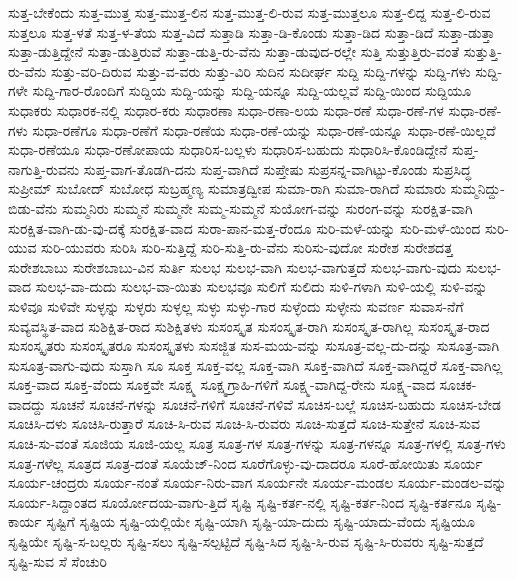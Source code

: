 {ಸುತ್ತ-ಬೇಕೆಂದು
ಸುತ್ತ-ಮುತ್ತ
ಸುತ್ತ-ಮುತ್ತ-ಲಿನ
ಸುತ್ತ-ಮುತ್ತ-ಲಿ-ರುವ
ಸುತ್ತ-ಮುತ್ತಲೂ
ಸುತ್ತ-ಲಿದ್ದ
ಸುತ್ತ-ಲಿ-ರುವ
ಸುತ್ತಲೂ
ಸುತ್ತ-ಳತೆ
ಸುತ್ತ-ಳ-ತೆಯ
ಸುತ್ತ-ವಿದೆ
ಸುತ್ತಾಡಿ
ಸುತ್ತಾ-ಡಿ-ಕೊಂಡು
ಸುತ್ತಾ-ಡಿದ
ಸುತ್ತಾ-ಡಿದೆ
ಸುತ್ತಾ-ಡುತ್ತಾ
ಸುತ್ತಾ-ಡುತ್ತಿದ್ದೇನೆ
ಸುತ್ತಾ-ಡುತ್ತಿರುವೆ
ಸುತ್ತಾ-ಡುತ್ತಿ-ರು-ವೆನು
ಸುತ್ತಾ-ಡುವುದ-ರಲ್ಲೇ
ಸುತ್ತಿ
ಸುತ್ತುತ್ತಿರು-ವಂತೆ
ಸುತ್ತುತ್ತಿ-ರು-ವೆನು
ಸುತ್ತು-ವರಿ-ದಿರುವ
ಸುತ್ತು-ವ-ವರು
ಸುತ್ತು-ವಿರಿ
ಸುದಿನ
ಸುದೀರ್ಘ
ಸುದ್ದಿ
ಸುದ್ದಿ-ಗಳನ್ನು
ಸುದ್ದಿ-ಗಳು
ಸುದ್ದಿ-ಗಳೇ
ಸುದ್ದಿ-ಗಾರ-ರೊಂದಿಗೆ
ಸುದ್ದಿಯ
ಸುದ್ದಿ-ಯನ್ನು
ಸುದ್ದಿ-ಯನ್ನೂ
ಸುದ್ದಿ-ಯಲ್ಲವೆ
ಸುದ್ದಿ-ಯಿಂದ
ಸುದ್ದಿಯೂ
ಸುಧಾಕರು
ಸುಧಾರಕ-ನಲ್ಲಿ
ಸುಧಾರ-ಕರು
ಸುಧಾರಣಾ
ಸುಧಾ-ರಣಾ-ಲಯ
ಸುಧಾ-ರಣೆ
ಸುಧಾ-ರಣೆ-ಗಳ
ಸುಧಾ-ರಣೆ-ಗಳು
ಸುಧಾ-ರಣೆಗೂ
ಸುಧಾ-ರಣೆಗೆ
ಸುಧಾ-ರಣೆಯ
ಸುಧಾ-ರಣೆ-ಯನ್ನು
ಸುಧಾ-ರಣೆ-ಯನ್ನೂ
ಸುಧಾ-ರಣೆ-ಯಿಲ್ಲದೆ
ಸುಧಾ-ರಣೆಯೂ
ಸುಧಾ-ರಣೋಪಾಯ
ಸುಧಾರಿಸ-ಬಲ್ಲಳು
ಸುಧಾರಿಸ-ಬಹುದು
ಸುಧಾರಿಸಿ-ಕೊಂಡಿದ್ದೇನೆ
ಸುಪ್ತ-ನಾಗುತ್ತಿ-ರುವನು
ಸುಪ್ತ-ವಾಗ-ತೊಡಗಿ-ದನು
ಸುಪ್ತ-ವಾಗಿದೆ
ಸುಪ್ತೇಷು
ಸುಪ್ರಸನ್ನ-ವಾಗಿಟ್ಟು-ಕೊಂಡು
ಸುಪ್ರಸಿದ್ಧ
ಸುಪ್ರೀಮ್
ಸುಬೋದ್
ಸುಬೋಧ
ಸುಬ್ರಹ್ಮಣ್ಯ
ಸುಮಾತ್ರದ್ವೀಪ
ಸುಮಾ-ರಾಗಿ
ಸುಮಾ-ರಾಗಿದೆ
ಸುಮಾರು
ಸುಮ್ಮನಿದ್ದು-ಬಿಡು-ವೆನು
ಸುಮ್ಮನಿರು
ಸುಮ್ಮನೆ
ಸುಮ್ಮನೇ
ಸುಮ್ಮ-ಸುಮ್ಮನೆ
ಸುಯೋಗ-ವನ್ನು
ಸುರಂಗ-ವನ್ನು
ಸುರಕ್ಷಿತ-ವಾಗಿ
ಸುರಕ್ಷಿತ-ವಾಗಿ-ಡು-ವು-ದಕ್ಕೆ
ಸುರಕ್ಷಿತ-ವಾದ
ಸುರಾ-ಪಾನ-ಮತ್ತ-ರೆಂದೂ
ಸುರಿ-ಮಳೆ-ಯನ್ನು
ಸುರಿ-ಮಳೆ-ಯಿಂದ
ಸುರಿ-ಯುವ
ಸುರಿ-ಯುವರು
ಸುರಿಸಿ
ಸುರಿ-ಸುತ್ತಿದ್ದೆ
ಸುರಿ-ಸುತ್ತಿ-ರು-ವೆನು
ಸುರಿಸು-ವುದೋ
ಸುರೇಶ
ಸುರೇಶದತ್ತ
ಸುರೇಶಬಾಬು
ಸುರೇಶಬಾಬು-ವಿನ
ಸುರ್ತಿ
ಸುಲಭ
ಸುಲಭ-ವಾಗಿ
ಸುಲಭ-ವಾಗುತ್ತದೆ
ಸುಲಭ-ವಾಗು-ವುದು
ಸುಲಭ-ವಾದ
ಸುಲಭ-ವಾ-ದುದು
ಸುಲಭ-ವಾ-ಯಿತು
ಸುಲಭವೂ
ಸುಲಿಗೆ
ಸುಲಿದು
ಸುಳಿ-ಗಳಾಗಿ
ಸುಳಿ-ಯಲ್ಲಿ
ಸುಳಿ-ವನ್ನು
ಸುಳಿವೂ
ಸುಳಿವೇ
ಸುಳ್ಳನ್ನು
ಸುಳ್ಳರು
ಸುಳ್ಳಲ್ಲ
ಸುಳ್ಳು
ಸುಳ್ಳು-ಗಾರ
ಸುಳ್ಳೆಂದು
ಸುಳ್ಳೇನು
ಸುವರ್ಣ
ಸುವಾಸ-ನೆಗೆ
ಸುವ್ಯವಸ್ಥಿತ-ವಾದ
ಸುಶಿಕ್ಷಿತ-ರಾದ
ಸುಶಿಕ್ಷಿತಳು
ಸುಸಂಸ್ಕೃತ
ಸುಸಂಸ್ಕೃತ-ರಾಗಿ
ಸುಸಂಸ್ಕೃತ-ರಾಗಿಲ್ಲ
ಸುಸಂಸ್ಕೃತ-ರಾದ
ಸುಸಂಸ್ಕೃತರು
ಸುಸಂಸ್ಕೃತರೂ
ಸುಸಂಸ್ಕೃತಳು
ಸುಸಜ್ಜಿತ
ಸುಸ-ಮಯ-ವನ್ನು
ಸುಸೂತ್ರ-ವಲ್ಲ-ದು-ದನ್ನು
ಸುಸೂತ್ರ-ವಾಗಿ
ಸುಸೂತ್ರ-ವಾಗು-ವುದು
ಸುಸ್ತಾಗಿ
ಸೂ
ಸೂಕ್ತ
ಸೂಕ್ತ-ವಲ್ಲ
ಸೂಕ್ತ-ವಾಗಿ
ಸೂಕ್ತ-ವಾಗಿದೆ
ಸೂಕ್ತ-ವಾಗಿದ್ದರೆ
ಸೂಕ್ತ-ವಾಗಿಲ್ಲ
ಸೂಕ್ತ-ವಾದ
ಸೂಕ್ತ-ವೆಂದು
ಸೂಕ್ತವೇ
ಸೂಕ್ಷ್ಮ
ಸೂಕ್ಷ್ಮಗ್ರಾಹಿ-ಗಳಿಗೆ
ಸೂಕ್ಷ್ಮ-ವಾಗಿದ್ದ-ರೇನು
ಸೂಕ್ಷ್ಮ-ವಾದ
ಸೂಚಕ-ವಾದದ್ದು
ಸೂಚನೆ
ಸೂಚನೆ-ಗಳನ್ನು
ಸೂಚನೆ-ಗಳಿಗೆ
ಸೂಚನೆ-ಗಳಿವೆ
ಸೂಚಿಸ-ಬಲ್ಲೆ
ಸೂಚಿಸ-ಬಹುದು
ಸೂಚಿಸ-ಬೇಡ
ಸೂಚಿಸಿ-ದಳು
ಸೂಚಿಸಿ-ರುತ್ತಾರೆ
ಸೂಚಿ-ಸಿ-ರುವ
ಸೂಚಿ-ಸಿ-ರುವರು
ಸೂಚಿ-ಸುತ್ತದೆ
ಸೂಚಿ-ಸುತ್ತೇನೆ
ಸೂಚಿ-ಸುವ
ಸೂಚಿ-ಸು-ವಂತೆ
ಸೂಜಿಯ
ಸೂಜಿ-ಯಲ್ಲ
ಸೂತ್ರ
ಸೂತ್ರ-ಗಳ
ಸೂತ್ರ-ಗಳನ್ನು
ಸೂತ್ರ-ಗಳನ್ನೂ
ಸೂತ್ರ-ಗಳಲ್ಲಿ
ಸೂತ್ರ-ಗಳು
ಸೂತ್ರ-ಗಳೆಲ್ಲ
ಸೂತ್ರದ
ಸೂತ್ರ-ದಂತೆ
ಸೂಯೆಜ್-ನಿಂದ
ಸೂರೆಗೊಳ್ಳು-ವು-ದಾದರೂ
ಸೂರೆ-ಹೋಯಿತು
ಸೂರ್ಯ
ಸೂರ್ಯ-ಚಂದ್ರರು
ಸೂರ್ಯ-ನಂತೆ
ಸೂರ್ಯ-ನಿರು-ವಾಗ
ಸೂರ್ಯನೇ
ಸೂರ್ಯ-ಮಂಡಲ
ಸೂರ್ಯ-ಮಂಡಲ-ವನ್ನು
ಸೂರ್ಯ-ಸಿದ್ದಾಂತದ
ಸೂರ್ಯೋದಯ-ವಾಗು-ತ್ತಿದೆ
ಸೃಷ್ಟಿ
ಸೃಷ್ಟಿ-ಕರ್ತ-ನಲ್ಲಿ
ಸೃಷ್ಟಿ-ಕರ್ತ-ನಿಂದ
ಸೃಷ್ಟಿ-ಕರ್ತನೂ
ಸೃಷ್ಟಿ-ಕಾರ್ಯ
ಸೃಷ್ಟಿಗೆ
ಸೃಷ್ಟಿಯ
ಸೃಷ್ಟಿ-ಯಲ್ಲಿಯೇ
ಸೃಷ್ಟಿ-ಯಾಗಿ
ಸೃಷ್ಟಿ-ಯಾ-ದುದು
ಸೃಷ್ಟಿ-ಯಾದು-ವೆಂದು
ಸೃಷ್ಟಿಯೂ
ಸೃಷ್ಟಿಯೇ
ಸೃಷ್ಟಿ-ಸ-ಬಲ್ಲರು
ಸೃಷ್ಟಿ-ಸಲು
ಸೃಷ್ಟಿ-ಸಲ್ಪಟ್ಟಿದೆ
ಸೃಷ್ಟಿ-ಸಿದ
ಸೃಷ್ಟಿ-ಸಿ-ರುವ
ಸೃಷ್ಟಿ-ಸಿ-ರುವರು
ಸೃಷ್ಟಿ-ಸುತ್ತದೆ
ಸೃಷ್ಟಿ-ಸುವ
ಸೆ
ಸೆಂಚುರಿ
}
